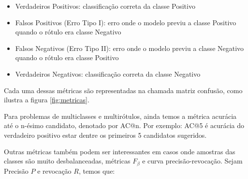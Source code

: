 \begin{itemize}
    \item Verdadeiros Positivos: classificação correta da classe Positivo
    \item Falsos Positivos (Erro Tipo I): erro onde o modelo previu a classe Positivo quando o rótulo era classe Negativo
    \item Falsos Negativos (Erro Tipo II): erro onde o modelo previu a classe Negativo quando o rótulo era classe Positivo
    \item Verdadeiros Negativos: classificação correta da classe Negativo
\end{itemize}

Cada uma dessas métricas são representadas na chamada matriz confusão, como ilustra a figura \ref{fig:metricas}.

Para problemas de multiclasses e multirótulos, ainda temos a métrica acurácia até o n-ésimo candidato, denotado por AC@n. Por exemplo: AC@5 é acurácia do verdadeiro positivo estar dentre os primeiros 5 candidatos sugeridos.

Outras métricas também podem ser interessantes em casos onde amostras das classes são muito desbalanceadas, métricas $F_\beta$ e curva precisão-revocação. Sejam Precisão $P$ e revocação $R$, temos que:



